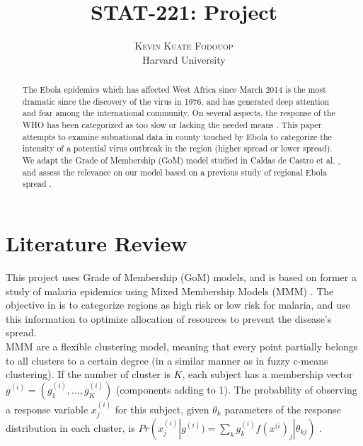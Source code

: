 \documentclass[twoside]{article}
\title{\vspace{-15mm}\fontsize{24pt}{10pt}\selectfont\textbf{STAT-221: Project}} %
\author{
\large
\textsc{Kevin Kuate Fodouop}\\ %
\normalsize Harvard University \\ %
\vspace{-5mm}
}
\date{}
\begin{document}
\maketitle %

\thispagestyle{fancy} %


\begin{abstract}
The Ebola epidemics which has affected West Africa since March 2014 is the most dramatic since the discovery of the virus in 1976, and has generated deep attention and fear among the international community. On several aspects, the response of the WHO has been categorized as too slow or lacking the needed means \cite{ebolresp}. This paper attempts to examine subnational data in county touched by Ebola to categorize the intensity of a potential virus outbreak in the region (higher spread or lower spread). We adapt the Grade of Membership (GoM) model studied in Caldas de Castro et al. \cite{malaria}, and assess the relevance on our model based on a previous study of regional Ebola spread \cite{ebolpred}.
\end{abstract}



\section{Literature Review}

This project uses Grade of Membership (GoM) models, and is based on former a study of malaria epidemics using Mixed Membership Models (MMM) \cite{malaria}. The objective in \cite{malaria} is to categorize regions as high risk or low risk for malaria, and use this information to optimize allocation of resources to prevent the disease's spread.\\

MMM are a flexible clustering model, meaning that every point partially belongs to all clusters to a certain degree (in a similar manner as in fuzzy c-means clustering). If the number of cluster is $K$, each subject has a membership vector $g^{(i)} = (g^{(i)}_1, ..., g^{(i)}_K)$ (components adding to 1). The probability of observing a response variable $x^{(i)}_j$ for this subject, given $\theta_k$ parameters of the response distribution in each cluster, is $Pr(x^{(i)}_j | g^{(i)}) = \sum_k g^{(i)}_k f(x^{(i})_j | \theta_{k j})$ \cite{mixmem}.\\
\end{document}
